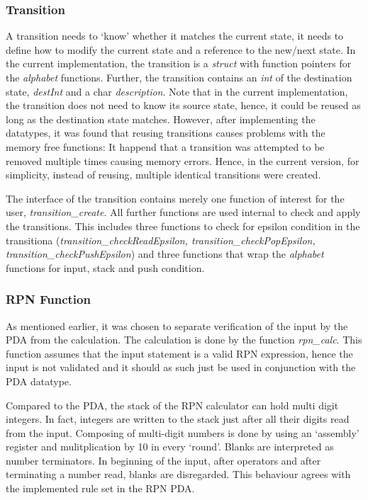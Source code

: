 \documentclass[a4paper,11pt,twoside]{article}
\begin{document}
\subsubsection{Transition}
A transition needs to `know' whether it matches the current
state, it needs to define how to modify the current state and a
reference to the new/next state. In the current implementation, the
transition is a \textit{struct} with function pointers for the
\textit{alphabet} functions. Further, the transition contains an \textit{int}
of the destination state, \textit{destInt} and a char
\textit{description}. Note that in the current implementation, the
transition does not need to know its source state, hence, it could be
reused as long as the destination state matches. However, after
implementing the datatypes, it was found that reusing transitions
causes problems with the memory free functions: It happend that a
transition was attempted to be removed multiple times causing memory
errors. Hence, in the current version, for simplicity, instead of
reusing, multiple identical transitions were created.
  
The interface of the transition contains merely one function of
interest for the user, \textit{transition\_create}. All further
functions are used internal to check and apply the transitions. This
includes three functions to check for epsilon condition in the
transitiona (\textit{transition\_checkReadEpsilon,
  transition\_checkPopEpsilon, transition\_checkPushEpsilon}) and three
functions that wrap the \textit{alphabet} functions for input, stack
and push condition. 

\subsubsection{RPN Function}
As mentioned earlier, it was chosen to separate verification of the
input by the PDA from the calculation. The calculation is done by the
function \textit{rpn\_calc}. This function assumes that the input
statement is a valid RPN expression, hence the input is not
validated and it should as such just be used in conjunction with the
PDA datatype.

Compared to the PDA, the stack of the RPN calculator can hold multi
digit integers. In fact, integers are written to the stack just after
all their digits read from the input. Composing of multi-digit numbers
is done by using an `assembly' register and mulitplication by 10 in
every `round'. Blanks are interpreted as number terminators. In
beginning of the input, after operators and after terminating a number
read, blanks are disregarded. This behaviour agrees with the
implemented rule set in the RPN PDA. 
\end{document}
